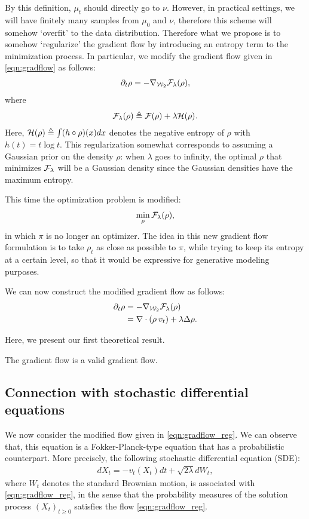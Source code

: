 By this definition, $\mu_t$ should directly go to $\nu$. However, in practical settings, we will have finitely many samples from $\mu_0$ and $\nu$, therefore this scheme will somehow `overfit' to the data distribution. Therefore what we propose is to somehow `regularize' the gradient flow by introducing an entropy term to the minimization process. In particular, we modify the gradient flow given in \eqref{eqn:gradflow} as follows:
\begin{align}
\partial_t \rho = - \nabla_{{\cal W}_2} {\cal F}_\lambda(\rho),
\end{align}
where
\begin{align}
{\cal F}_\lambda(\rho) \triangleq {\cal F}(\rho) + \lambda {\cal H}(\rho).
\end{align}
Here, ${\cal H}(\rho) \triangleq \int (h \circ \rho) (x) dx $ denotes the negative entropy of $\rho$ with $h(t) = t \log t$. This regularization somewhat corresponds to assuming a Gaussian prior on the density $\rho$: when $\lambda$ goes to infinity, the optimal $\rho$ that minimizes ${\cal F}_\lambda$ will be a Gaussian density since the Gaussian densities have the maximum entropy.

This time the optimization problem is modified:
\begin{align}
\min_\rho {\cal F}_\lambda(\rho),
\end{align}
in which $\pi$ is no longer an optimizer. The idea in this new gradient flow formulation is to take $\rho_t$ as close as possible to $\pi$, while trying to keep its entropy at a certain level, so that it would be expressive for generative modeling purposes.

We can now construct the modified gradient flow as follows:
\begin{align}
\partial_t \rho &= - \nabla_{{\cal W}_2} {\cal F}_\lambda(\rho) \\
&=  \nabla \cdot (\rho \> v_t) + \lambda \Delta \rho. \label{eqn:gradflow_reg}
\end{align}

Here, we present our first theoretical result. 
\begin{thm}
The gradient flow is a valid gradient flow. 
\end{thm}


\subsection{Connection with stochastic differential equations}

We now consider the modified flow given in \eqref{eqn:gradflow_reg}. We can observe that, this equation is a Fokker-Planck-type equation that has a probabilistic counterpart. More precisely, the following stochastic differential equation (SDE):
\begin{align}
d X_t = - v_t(X_t) dt + \sqrt{2 \lambda } d W_t, \label{eqn:sde}
\end{align}
where $W_t$ denotes the standard Brownian motion, is associated with \eqref{eqn:gradflow_reg}, in the sense that the probability measures of the solution process $(X_t)_{t\geq0}$ satisfies the flow \eqref{eqn:gradflow_reg}.  

